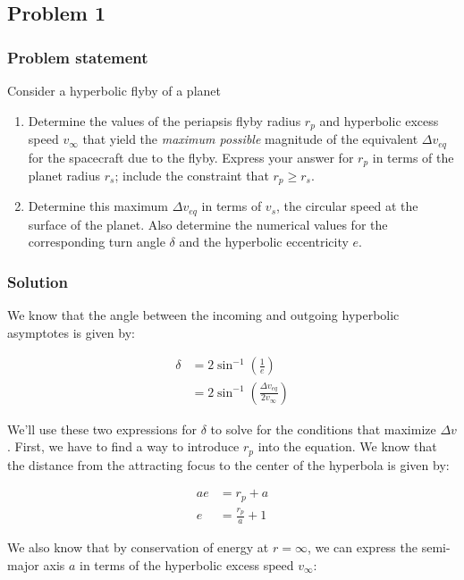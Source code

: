 \subsection{Problem 1}

\subsubsection{Problem statement}
Consider a hyperbolic flyby of a planet

\begin{enumerate}
    \item Determine the values of the periapsis flyby radius $r_p$ and hyperbolic excess speed $v_\infty$ that yield the \textit{maximum possible} magnitude of the equivalent $\Delta v_{eq}$ for the spacecraft due to the flyby. Express your answer for $r_p$ in terms of the planet radius $r_s$; include the constraint that $r_p \geq r_s$.
    \item Determine this maximum $\Delta v_{eq}$ in terms of $v_s$, the circular speed at the surface of the planet. Also determine the numerical values for the corresponding turn angle $\delta$ and the hyperbolic eccentricity $e$.
\end{enumerate}

\subsubsection{Solution}

We know that the angle between the incoming and outgoing hyperbolic asymptotes is given by:

\begin{align*}
    \delta &= 2 \sin^{-1} \left( \frac{1}{e} \right) \\
    &= 2 \sin^{-1} \left( \frac{\Delta v_{eq}}{2 v_\infty} \right)
\end{align*}

We'll use these two expressions for $\delta$ to solve for the conditions that maximize $\Delta v$. First, we have to find a way to introduce $r_p$ into the equation. We know that the distance from the attracting focus to the center of the hyperbola is given by:

\begin{align*}
    ae &= r_p + a \\
    e &= \frac{r_p}{a} + 1
\end{align*}

We also know that by conservation of energy at $r=\infty$, we can express the semi-major axis $a$ in terms of the hyperbolic excess speed $v_\infty$:

